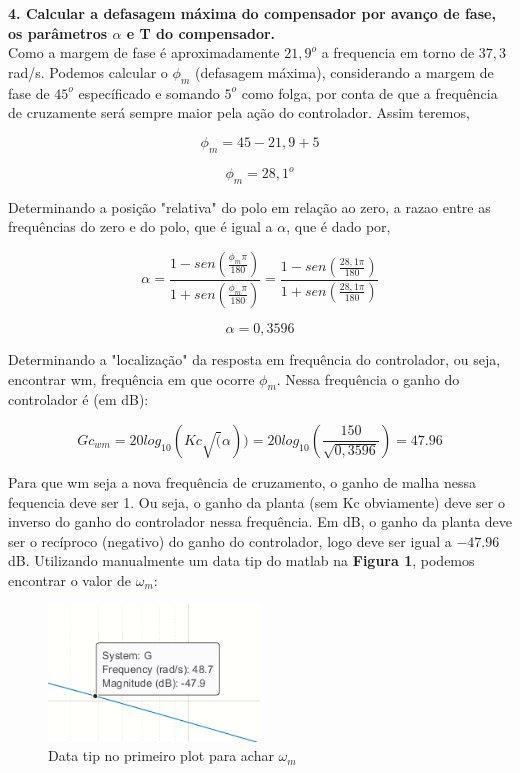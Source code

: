 
\textbf{4. Calcular a defasagem máxima do compensador por avanço de fase, os parâmetros $\alpha$ e T do compensador.}\\

Como a margem de fase é aproximadamente $21,9^o$ a frequencia em torno de $37,3$ rad/s. Podemos calcular o $\phi_m$ (defasagem máxima), considerando a margem de fase de $45^o$ específicado e somando $5^o$ como folga, por conta de que a frequência de cruzamente será sempre maior pela ação do controlador. Assim teremos, 

\[\phi_m = 45 - 21,9 + 5\]

{\color{red}\[ \boxed{\phi_m = 28,1^o} \]}

Determinando a posição "relativa" do polo em relação ao zero, a razao entre as frequências do zero e do polo, que é igual a $\alpha$, que é dado por,

\[ \alpha = \dfrac{1-sen(\frac{\phi_m \pi}{180})}{1+sen(\frac{\phi_m \pi}{180})} = \dfrac{1-sen(\frac{28,1\pi}{180})}{1+sen(\frac{28,1 \pi}{180})} \]

{\color{red}\[ \boxed{\alpha = 0,3596} \]}

Determinando a "localização" da resposta em frequência do controlador, ou seja, encontrar wm, frequência em que ocorre $\phi_m$. Nessa frequência o ganho do controlador é (em dB):

\[ Gc_{wm}=20log_{10}(Kc\sqrt(\alpha)) = 20log_{10}(\frac{150}{\sqrt{0,3596}}) = 47.96 \]

Para que wm seja a nova frequência de cruzamento, o ganho de malha nessa fequencia deve ser 1. Ou seja, o ganho da planta (sem Kc obviamente) deve ser o inverso do ganho do controlador nessa frequência. Em dB, o ganho da planta deve ser o recíproco (negativo) do ganho do controlador, logo deve ser igual a $-47.96$ dB. Utilizando manualmente um data tip do matlab na \textbf{Figura 1}, podemos encontrar o valor de $\omega_m$:

\begin{figure}[H]
  \centering
  \includegraphics[width=0.5\textwidth]{images/fig3.png}
  \caption{Data tip no primeiro plot para achar $\omega_m$}
\end{figure} \newpage

